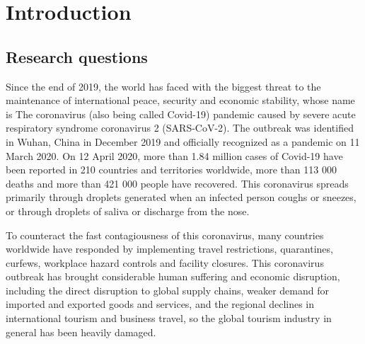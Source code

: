 \documentclass[draft=false
              ,paper=a4
              ,twoside=false
              ,fontsize=12pt
              ,headsepline
              ,BCOR10mm
              ,DIV11
              ]{scrbook}
\begin{document}

\frontmatter




\tableofcontents
{}
\listoffigures
{}
\listoftables
{}
\newpage

\mainmatter
\chapter{Introduction}
\vspace{6pt}
\section{Research questions}
\vspace{6pt}

Since the end of 2019, the world has faced with the biggest threat to the maintenance of international peace, security and economic stability, whose name is  The coronavirus (also being called Covid-19) pandemic caused by severe acute respiratory syndrome coronavirus 2 (SARS-CoV-2). The outbreak was identified in Wuhan, China in December 2019 and officially recognized as a pandemic on 11 March 2020. On 12 April 2020, more than 1.84 million cases of Covid-19 have been reported in 210 countries and territories worldwide, more than 113 000 deaths and more than 421 000 people have recovered. This coronavirus spreads primarily through droplets generated when an infected person coughs or sneezes, or through droplets of saliva or discharge from the nose. 

To counteract the fast contagiousness of this coronavirus, many countries worldwide have responded by implementing travel restrictions, quarantines, curfews, workplace hazard controls and facility closures. This coronavirus outbreak has brought considerable human suffering and economic disruption, including the direct disruption to global supply chains, weaker demand for imported and exported goods and services, and the regional declines in international tourism and business travel, so the global tourism industry in general has been heavily damaged. 
\end{document}
